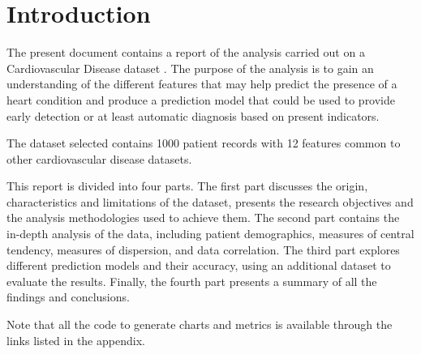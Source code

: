 \section{Introduction}
The present document contains a report of the analysis carried out on a Cardiovascular Disease dataset
\cite{Dataset}. The purpose of the analysis is to gain an understanding of the
different features that may help predict the presence of a heart condition and produce a prediction model
that could be used to provide early detection or at least automatic diagnosis based on present indicators.

The dataset selected contains 1000 patient records with 12 features common to other cardiovascular disease datasets.

This report is divided into four parts. The first part discusses the origin, characteristics and limitations of the dataset,
presents the research objectives and the analysis methodologies used to achieve them. The second part contains the in-depth
analysis of the data, including patient demographics, measures of central tendency, measures of dispersion, and data correlation.
The third part explores different prediction models and their accuracy, using an additional dataset to evaluate the results.
Finally, the fourth part presents a summary of all the findings and conclusions.

Note that all the code to generate charts and metrics is available through the links listed in the appendix.